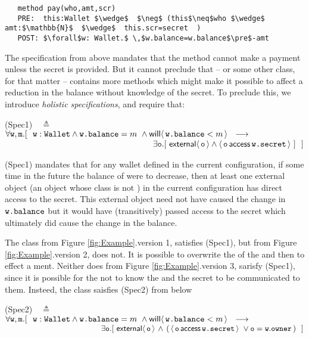 \documentclass[acmsmall,screen]{acmart}
\begin{document}
\begin{lstlisting}
   method pay(who,amt,scr)
   PRE:  this:Wallet $\wedge$  $\neg$ (this$\neq$who $\wedge$ amt:$\mathbb{N}$  $\wedge$  this.scr=secret  )
   POST: $\forall$w: Wallet.$ \,$w.balance=w.balance$\pre$-amt 
 \end{lstlisting}
\vspace{-.2in}
The specification from above mandates that the method  cannot make a payment unless the secret is
provided. But it cannot preclude that  -- or some other class, for that matter -- contains more methods 
which might make it possible to affect a reduction in the balance   without knowledge of the
secret. To preclude this, we introduce \emph{holistic specifications}, and require that:

\vspace{.2in}
(Spec1)\ \  $\triangleq$\ \ $\forall \prg{w},\prg{m}.[\ \ \prg{w}:\prg{Wallet} \wedge \prg{w.balance}=m\ \wedge \Future{\prg{w.balance}<m} \ \    
    \longrightarrow \ \    \hfill$ \\
  $\strut \hspace{6.3cm} 
  \exists \prg{o}. [\  \External{\prg{o}} \wedge  \CanAccess{\prg{o}}{\prg{w.secret}}\ ]  \  \ ] \hfill $
\vspace{.2in}

(Spec1) mandates that for any wallet  defined in the current configuration, if some time in the future the balance of
\prg{w} were to decrease, then at least one external object (\ie an object whose class is not \prg{Wallet}) in the current configuration
has direct access to the secret. This external object need not have caused the change in ${\mbox{\tt{w.balance}}}$ but it would  have (transitively) passed access to the secret which ultimately did cause the change in the balance.

The class  from Figure \ref{fig:Example}.version 1, satisfies (Spec1), but  from Figure \ref{fig:Example}.version 2, does not.
It is possible to overwrite the \prg{secret} of the \prg{Wallet} and then to effect a \prg{pay}ment. Neither does \prg{Wallet} from Figure \ref{fig:Example}.version 3,  sarisfy (Spec1), since it is possible for the  not to know the  and the secret to be 
communicated to them. Insteed, the class saisfies (Spec2) from below
 

\vspace{.2in}
(Spec2)\ \  $\triangleq$\ \ $\forall \prg{w},\prg{m}.[\ \ \prg{w}:\prg{Wallet} \wedge \prg{w.balance}=m\ \wedge \Future{\prg{w.balance}<m} \ \    
    \longrightarrow \ \    \hfill$ \\
  $\strut \hspace{4.3cm} 
  \exists \prg{o}. [\  \External{\prg{o}}\,  \wedge\, (\,  \CanAccess{\prg{o}}{\prg{w.secret}}\ \vee \prg{o}=\prg{w}.\prg{owner}\, )   \ \ ] \hfill $
\vspace{.2in}
\end{document}
